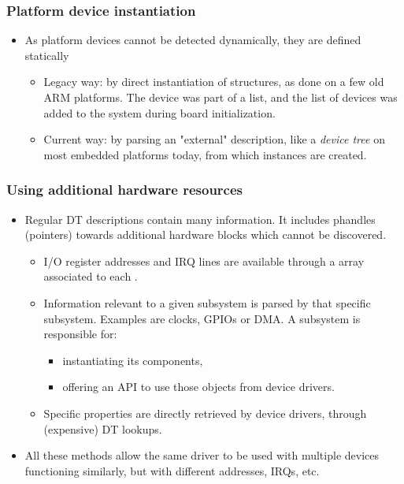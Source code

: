 \begin{frame}[fragile]
  \frametitle{Platform device instantiation}
  \begin{itemize}
  \item As platform devices cannot be detected dynamically, they are
    defined statically
    \begin{itemize}
    \item Legacy way: by direct instantiation of 
      structures, as done on a few old ARM platforms. The device was
      part of a list, and the list of devices was added to the system
      during board initialization.
    \item Current way: by parsing an "external" description, like a
      \emph{device tree} on most embedded platforms today, from which
       instances are created.
    \end{itemize}
  \end{itemize}
\end{frame}

\begin{frame}
  \frametitle{Using additional hardware resources}
  \begin{itemize}
  \item Regular DT descriptions contain many information. It includes
    phandles (pointers) towards additional hardware blocks which cannot
    be discovered.
    \begin{itemize}
    \item I/O register addresses and IRQ lines are available through a
       array associated to each .
    \item Information relevant to a given subsystem is parsed by that
      specific subsystem. Examples are clocks, GPIOs or DMA.
      A subsystem is responsible for:
      \begin{itemize}
      \item instantiating its components,
      \item offering an API to use those objects from device drivers.
      \end{itemize}
    \item Specific properties are directly retrieved by
      device drivers, through (expensive) DT lookups.
    \end{itemize}
  \item All these methods allow the same driver to be used with
    multiple devices functioning similarly, but with different
    addresses, IRQs, etc.
  \end{itemize}
\end{frame}

